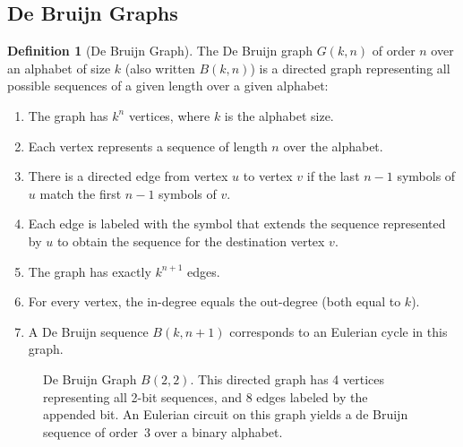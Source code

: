 \documentclass{article}
\theoremstyle{definition}
\newtheorem{definition}{Definition}
\begin{document}
\subsection{De Bruijn Graphs}
\begin{definition}[De Bruijn Graph]
The De Bruijn graph $G(k,n)$ of order $n$ over an alphabet of size $k$ (also written $B(k,n)$) is a directed graph representing all possible sequences of a given length over a given alphabet:

\begin{enumerate}
    \item The graph has $k^{n}$ vertices, where $k$ is the alphabet size.
    \item Each vertex represents a sequence of length $n$ over the alphabet.
    \item There is a directed edge from vertex $u$ to vertex $v$ if the last $n-1$ symbols of $u$ match the first $n-1$ symbols of $v$.
    \item Each edge is labeled with the symbol that extends the sequence represented by $u$ to obtain the sequence for the destination vertex $v$.
    \item The graph has exactly $k^{n+1}$ edges.
    \item For every vertex, the in-degree equals the out-degree (both equal to $k$).
    \item A De Bruijn sequence $B(k,n+1)$ corresponds to an Eulerian cycle in this graph.
\end{enumerate}
\end{definition}

\begin{figure}[ht]
  \centering
\caption{De Bruijn Graph $B(2,2)$. This directed graph has 4 vertices representing all 2-bit sequences, and 8 edges labeled by the appended bit. An Eulerian circuit on this graph yields a de Bruijn sequence of order~3 over a binary alphabet.}
\label{fig:de-bruijn-b22}
\end{figure}
\end{document}
